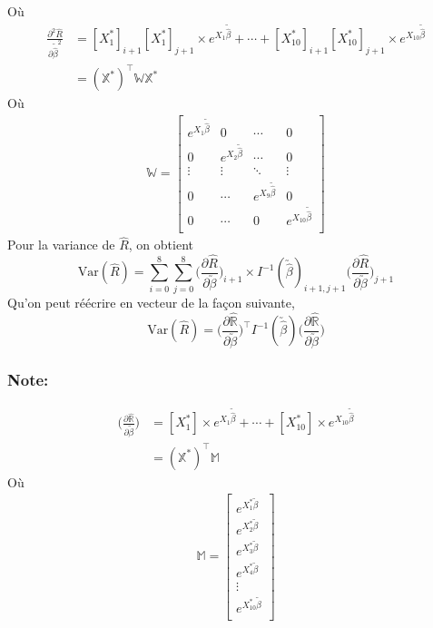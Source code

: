 Où 
\begin{align*}
\frac{\partial^2 \widehat{R}}{\partial \utilde{\widehat{\beta}}^2} &= [X^*_1]_{i+1} [X^*_1]_{j+1} \times e^{X_1 \utilde{\widehat{\beta}}} + \cdots + [X^*_{10}]_{i+1} [X^*_{10}]_{j+1} \times e^{X_{10}\utilde{\widehat{\beta}}} \\
&= (\mathbb{X}^*)^\intercal \mathbb{W}\mathbb{X}^*
\end{align*}
Où
\begin{align*}
\mathbb{W} = 
\begin{bmatrix} 
e^{X_{1}\utilde{\widehat{\beta}}} & 0 & \cdots & 0 \\
0 & e^{X_{2}\utilde{\widehat{\beta}}}  & \cdots & 0\\
\vdots & \vdots & \ddots & \vdots \\
0 & \cdots & e^{X_{9}\utilde{\widehat{\beta}}} & 0\\
0 & \cdots & 0 & e^{X_{10}\utilde{\widehat{\beta}}} \\
\end{bmatrix}
\end{align*}
Pour la variance de $\widehat{R}$, on obtient
\begin{equation}
\text{Var}(\widehat{R}) = \sum_{i=0}^{8} \sum_{j=0}^{8} \Bigg( \frac{\partial \widehat{R}}{\partial \utilde{\beta}} \Bigg)_{i+1} \times I^{-1}(\utilde{\widehat{\beta}})_{i+1,j+1} \Bigg( \frac{\partial \widehat{R}}{\partial \utilde{\beta}} \Bigg)_{j+1}
\end{equation}
Qu'on peut réécrire en vecteur de la façon suivante,
\begin{equation}
\label{eq:GLM:mat}
\text{Var}(\widehat{R}) = \Bigg( \frac{\partial \widehat{\mathbb{R}}}{\partial \utilde{\beta}} \Bigg)^\intercal I^{-1}(\utilde{\widehat{\beta}}) \Bigg( \frac{\partial \widehat{\mathbb{R}}}{\partial \utilde{\beta}} \Bigg)
\end{equation}

\subsubsection*{Note:}
\begin{align*}
\Bigg( \frac{\partial \widehat{\mathbb{R}}}{\partial \utilde{\beta}} \Bigg) &= [X^*_1] \times e^{X_1 \utilde{\widehat{\beta}}} + \cdots + [X^*_{10}] \times e^{X_{10}\utilde{\widehat{\beta}}} \\
&= (\mathbb{X}^*)^\intercal \mathbb{M}
\end{align*}
Où 
\begin{align*}
\mathbb{M} =
\begin{bmatrix} 
e^{X_1^*\utilde{\beta}} \\
e^{X_2^*\utilde{\beta}}  \\
e^{X_3^*\utilde{\beta}}  \\
e^{X_4^*\utilde{\beta}}  \\
\vdots \\
e^{X_{10}^*\utilde{\beta}} \\
\end{bmatrix}
\end{align*}

